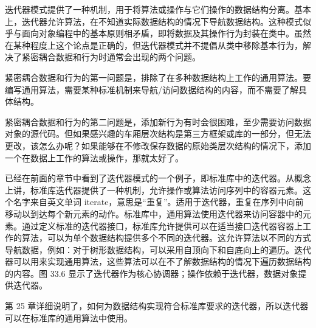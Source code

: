 迭代器模式提供了一种机制，用于将算法或操作与它们操作的数据结构分离。基本上，迭代器允许算法，在不知道实际数据结构的情况下导航数据结构。这种模式似乎与面向对象编程中的基本原则相矛盾，即将数据及其操作行为封装在类中。虽然在某种程度上这个论点是正确的，但迭代器模式并不提倡从类中移除基本行为，解决了紧密耦合数据和行为时通常会出现的两个问题。

紧密耦合数据和行为的第一问题是，排除了在多种数据结构上工作的通用算法。要编写通用算法，需要某种标准机制来导航/访问数据结构的内容，而不需要了解具体结构。

紧密耦合数据和行为的第二问题是，添加新行为有时会很困难，至少需要访问数据对象的源代码。但如果感兴趣的车厢层次结构是第三方框架或库的一部分，但无法更改，该怎么办呢？如果能够在不修改保存数据的原始类层次结构的情况下，添加一个在数据上工作的算法或操作，那就太好了。

已经在前面的章节中看到了迭代器模式的一个例子，即标准库中的迭代器。从概念上讲，标准库迭代器提供了一种机制，允许操作或算法访问序列中的容器元素。这个名字来自英文单词 iterate，意思是“重复”。适用于迭代器，重复在序列中向前移动以到达每个新元素的动作。标准库中，通用算法使用迭代器来访问容器中的元素。通过定义标准的迭代器接口，标准库允许提供可以在适当接口迭代器容器上工作的算法，可以为单个数据结构提供多个不同的迭代器。这允许算法以不同的方式导航数据，例如：对于树形数据结构，可以采用自顶向下和自底向上的遍历。迭代器可以用来实现通用算法，这些算法可以在不了解数据结构的情况下遍历数据结构的内容。图 33.6 显示了迭代器作为核心协调器；操作依赖于迭代器，数据对象提供迭代器。


第 25 章详细说明了，如何为数据结构实现符合标准库要求的迭代器，所以迭代器可以在标准库的通用算法中使用。




































